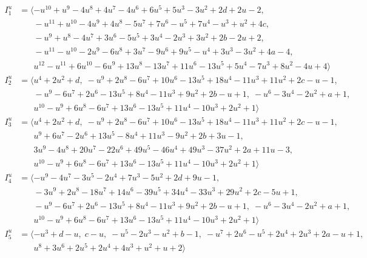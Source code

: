 \documentclass[1p]{elsarticle_modified}
\theoremstyle{definition}
\begin{document}
\begin{align*}
I^u_{1}&=\langle 
- u^{10}+u^9-4 u^8+4 u^7-4 u^6+6 u^5+5 u^3-3 u^2+2 d+2 u-2,\\
\phantom{I^u_{1}}&\phantom{= \langle  }- u^{11}+u^{10}-4 u^9+4 u^8-5 u^7+7 u^6- u^5+7 u^4- u^3+u^2+4 c,\\
\phantom{I^u_{1}}&\phantom{= \langle  }- u^9+u^8-4 u^7+3 u^6-5 u^5+3 u^4-2 u^3+3 u^2+2 b-2 u+2,\\
\phantom{I^u_{1}}&\phantom{= \langle  }- u^{11}- u^{10}-2 u^9-6 u^8+3 u^7-9 u^6+9 u^5- u^4+3 u^3-3 u^2+4 a-4,\\
\phantom{I^u_{1}}&\phantom{= \langle  }u^{12}- u^{11}+6 u^{10}-6 u^9+13 u^8-13 u^7+11 u^6-13 u^5+5 u^4-7 u^3+8 u^2-4 u+4\rangle \\
I^u_{2}&=\langle 
u^4+2 u^2+d,\;- u^9+2 u^8-6 u^7+10 u^6-13 u^5+18 u^4-11 u^3+11 u^2+2 c- u-1,\\
\phantom{I^u_{2}}&\phantom{= \langle  }- u^9-6 u^7+2 u^6-13 u^5+8 u^4-11 u^3+9 u^2+2 b- u+1,\;- u^6-3 u^4-2 u^2+a+1,\\
\phantom{I^u_{2}}&\phantom{= \langle  }u^{10}- u^9+6 u^8-6 u^7+13 u^6-13 u^5+11 u^4-10 u^3+2 u^2+1\rangle \\
I^u_{3}&=\langle 
u^4+2 u^2+d,\;- u^9+2 u^8-6 u^7+10 u^6-13 u^5+18 u^4-11 u^3+11 u^2+2 c- u-1,\\
\phantom{I^u_{3}}&\phantom{= \langle  }u^9+6 u^7-2 u^6+13 u^5-8 u^4+11 u^3-9 u^2+2 b+3 u-1,\\
\phantom{I^u_{3}}&\phantom{= \langle  }3 u^9-4 u^8+20 u^7-22 u^6+49 u^5-46 u^4+49 u^3-37 u^2+2 a+11 u-3,\\
\phantom{I^u_{3}}&\phantom{= \langle  }u^{10}- u^9+6 u^8-6 u^7+13 u^6-13 u^5+11 u^4-10 u^3+2 u^2+1\rangle \\
I^u_{4}&=\langle 
- u^9-4 u^7-3 u^5-2 u^4+7 u^3-5 u^2+2 d+9 u-1,\\
\phantom{I^u_{4}}&\phantom{= \langle  }-3 u^9+2 u^8-18 u^7+14 u^6-39 u^5+34 u^4-33 u^3+29 u^2+2 c-5 u+1,\\
\phantom{I^u_{4}}&\phantom{= \langle  }- u^9-6 u^7+2 u^6-13 u^5+8 u^4-11 u^3+9 u^2+2 b- u+1,\;- u^6-3 u^4-2 u^2+a+1,\\
\phantom{I^u_{4}}&\phantom{= \langle  }u^{10}- u^9+6 u^8-6 u^7+13 u^6-13 u^5+11 u^4-10 u^3+2 u^2+1\rangle \\
I^u_{5}&=\langle 
- u^3+d- u,\;c- u,\;- u^5-2 u^3- u^2+b-1,\;- u^7+2 u^6- u^5+2 u^4+2 u^3+2 a- u+1,\\
\phantom{I^u_{5}}&\phantom{= \langle  }u^8+3 u^6+2 u^5+2 u^4+4 u^3+u^2+u+2\rangle \\

\end{align*}
\end{document}

